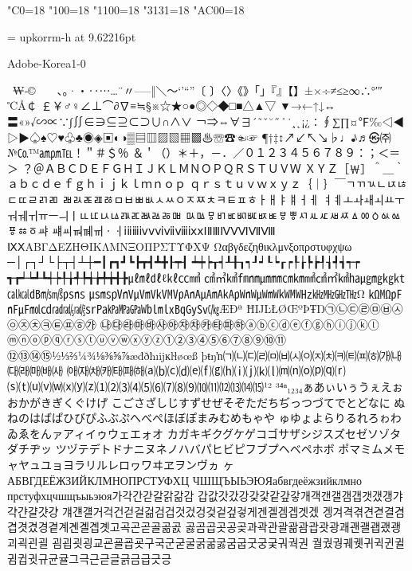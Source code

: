 %
%
%
%
\kcatcode"C0=18%
\kcatcode"100=18%
\kcatcode"1100=18%
\kcatcode"3131=18%
\kcatcode"AC00=18%

\font\upkorrm = upkorrm-h at 9.62216pt
\upkorrm


Adobe-Korea1-0

 ₩‐©ㅤ　、。·・‥⋯…¨〃–—‖＼～‘’“”〔
〕〈〉《》「」『』【】±×÷≠≤≥∞∴°′″℃Å￠
￡￥♂♀∠⊥⌒∂∇≡≒§※☆★○●◎◇◆□■△▲▽
▼→←↑↓↔〓«»√∽∝∵∫∬∈∋⊆⊇⊂⊃∪∩∧∨
￢⇒⇔∀∃´˜ˇ˘˝˚˙¸˛¡¿∶∮∑∏¤℉‰◁◀
▷▶♤♠♡♥♧♣◉◈▣◐◑▒▤▥▨▧▦▩♨☏☎☜☞
¶†‡↕↗↙↖↘♭♩♪♬㉿㈜№㏇™㏂㏘℡！＂＃＄％
＆＇（）＊＋，－．／０１２３４５６７８９：；＜＝＞
？＠ＡＢＣＤＥＦＧＨＩＪＫＬＭＮＯＰＱＲＳＴＵＶＷ
ＸＹＺ［￦］＾＿｀ａｂｃｄｅｆｇｈｉｊｋｌｍｎｏｐ
ｑｒｓｔｕｖｗｘｙｚ｛｜｝￣ㄱㄲㄳㄴㄵㄶㄷㄸㄹㄺㄻ
ㄼㄽㄾㄿㅀㅁㅂㅃㅄㅅㅆㅇㅈㅉㅊㅋㅌㅍㅎㅏㅐㅑㅒㅓㅔ
ㅕㅖㅗㅘㅙㅚㅛㅜㅝㅞㅟㅠㅡㅢㅣㅥㅦㅧㅨㅩㅪㅫㅬㅭㅮ
ㅯㅰㅱㅲㅳㅴㅵㅶㅷㅸㅹㅺㅻㅼㅽㅾㅿㆀㆁㆂㆃㆄㆅㆆㆇ
ㆈㆉㆊㆋㆌㆍㆎⅰⅱⅲⅳⅴⅵⅶⅷⅸⅹⅠⅡⅢⅣⅤⅥⅦⅧ
ⅨⅩΑΒΓΔΕΖΗΘΙΚΛΜΝΞΟΠΡΣΤΥΦΧΨ
Ωαβγδεζηθικλμνξοπρστυφχψω
─│┌┐┘└├┬┤┴┼━┃┏┓┛┗┣┳┫┻╋┠┯┨
┷┿┝┰┥┸╂┒┑┚┙┖┕┎┍┞┟┡┢┦┧┩┪┭┮
┱┲┵┶┹┺┽┾╀╁╃╄╅╆╇╈╉╊㎕㎖㎗ℓ㎘㏄㎣
㎤㎥㎦㎙㎚㎛㎜㎝㎞㎟㎠㎡㎢㏊㎍㎎㎏㏏㎈㎉㏈㎧㎨㎰㎱
㎲㎳㎴㎵㎶㎷㎸㎹㎀㎁㎂㎃㎄㎺㎻㎼㎽㎾㎿㎐㎑㎒㎓㎔Ω
㏀㏁㎊㎋㎌㏖㏅㎭㎮㎯㏛㎩㎪㎫㎬㏝㏐㏓㏃㏉㏜㏆ÆÐª
ĦĲĿŁØŒºÞŦŊ㉠㉡㉢㉣㉤㉥㉦㉧㉨㉩㉪㉫㉬㉭㉮
㉯㉰㉱㉲㉳㉴㉵㉶㉷㉸㉹㉺㉻ⓐⓑⓒⓓⓔⓕⓖⓗⓘⓙⓚⓛ
ⓜⓝⓞⓟⓠⓡⓢⓣⓤⓥⓦⓧⓨⓩ①②③④⑤⑥⑦⑧⑨⑩⑪
⑫⑬⑭⑮½⅓⅔¼¾⅛⅜⅝⅞æđðħıĳĸŀłøœß
þŧŋŉ㈀㈁㈂㈃㈄㈅㈆㈇㈈㈉㈊㈋㈌㈍㈎㈏㈐㈑㈒㈓㈔
㈕㈖㈗㈘㈙㈚㈛⒜⒝⒞⒟⒠⒡⒢⒣⒤⒥⒦⒧⒨⒩⒪⒫⒬⒭
⒮⒯⒰⒱⒲⒳⒴⒵⑴⑵⑶⑷⑸⑹⑺⑻⑼⑽⑾⑿⒀⒁⒂¹²
³⁴ⁿ₁₂₃₄ぁあぃいぅうぇえぉおかがきぎくぐけげ
こごさざしじすずせぜそぞただちぢっつづてでとどなに
ぬねのはばぱひびぴふぶぷへべぺほぼぽまみむめもゃや
ゅゆょよらりるれろゎわゐゑをんァアィイゥウェエォオ
カガキギクグケゲコゴサザシジスズセゼソゾタダチヂッ
ツヅテデトドナニヌネノハバパヒビピフブプヘベペホボ
ポマミムメモャヤュユョヨラリルレロヮワヰヱヲンヴヵ
ヶАБВГДЕЁЖЗИЙКЛМНОПРСТУФХЦ
ЧШЩЪЫЬЭЮЯабвгдеёжзийклмно
прстуфхцчшщъыьэюя가각간갇갈갉갊감
갑값갓갔강갖갗같갚갛개객갠갤갬갭갯갰갱갸갹갼걀걋걍
걔걘걜거걱건걷걸걺검겁것겄겅겆겉겊겋게겐겔겜겝겟겠
겡겨격겪견겯결겸겹겻겼경곁계곈곌곕곗고곡곤곧골곪곬
곯곰곱곳공곶과곽관괄괆괌괍괏광괘괜괠괩괬괭괴괵괸괼
굄굅굇굉교굔굘굡굣구국군굳굴굵굶굻굼굽굿궁궂궈궉권
궐궜궝궤궷귀귁귄귈귐귑귓규균귤그극근귿글긁금급긋긍
